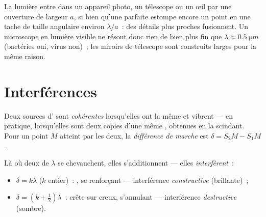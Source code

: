 \begin{remark}\label{rem:g12:light-as-wave:limits}
La lumière entre dans un appareil photo, un télescope ou un œil par
une ouverture de largeur $a$, si bien qu'une  parfaite
estompe encore un point en une tache de taille angulaire environ
$\lambda/a$~: des détails plus proches fusionnent. Un microscope en
lumière visible ne résout donc rien de bien plus fin que
$\lambda \approx \qty{0.5}{\micro m}$ (bactéries oui, virus non)~; les
miroirs de télescope sont construits larges pour la même raison.
\end{remark}

\section{Interférences}

\begin{definition}\label{def:g12:light-as-wave:coherent}
Deux sources d' sont \emph{cohérentes}
lorsqu'elles ont la même  et vibrent  --- en
pratique, lorsqu'elles sont deux copies d'une même
, obtenues en la scindant. Pour un point $M$ atteint par
les deux, la \emph{différence de marche}
est $\delta = S_2M - S_1M$.
\end{definition}

\begin{proposition}\label{prop:g12:light-as-wave:conditions}
Là où deux   de
 $\lambda$ se chevauchent, elles
s'additionnent --- elles \emph{interfèrent}~:
\begin{itemize}
  \item $\delta = k\lambda$ ($k$ entier)~: , se renforçant ---
        interférence \emph{constructive}
        (brillante)~;
  \item $\delta = (k + \tfrac12)\lambda$~: crête sur creux, s'annulant
        --- interférence \emph{destructive}
        (sombre).
\end{itemize}
\end{proposition}


